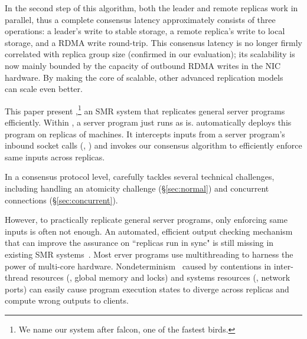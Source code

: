 In the second step of this algorithm, both the leader and remote replicas work 
in parallel, thus a complete consensus latency approximately consists of 
three operations: a leader's write to stable storage, a remote replica's write 
to local storage, and a RDMA write round-trip. This consensus 
latency is no longer firmly correlated with replica group size (confirmed in 
our evaluation); its scalability is now mainly bounded by the capacity of 
outbound RDMA writes in the NIC hardware. By making the core of \paxos 
scalable, other advanced replication 
models~\cite{epaxos:sosp13,mencius:osdi08,scatter:sosp11,manos:hotdep10} can 
scale even better.

This paper present \xxx,\footnote{We name our system after falcon, one of the 
fastest birds.} an SMR system that replicates general server programs 
efficiently. Within \xxx, a server program just runs as is. \xxx 
automatically deploys this program on replicas of machines. It intercepts 
inputs from a server program's inbound socket calls (\eg, \recv) and invokes 
our \paxos consensus algorithm to efficiently enforce same inputs across 
replicas.

In a consensus protocol level, \xxx carefully tackles several technical 
challenges, including handling an atomicity challenge (\S\ref{sec:normal}) and 
concurrent connections (\S\ref{sec:concurrent}).


However, to practically replicate general server programs, only enforcing same 
inputs is often not enough. An automated, efficient output checking mechanism 
that can improve the assurance on ``replicas run in sync" is still missing in 
existing SMR 
systems~\cite{calvin:sigmod12,rex:eurosys14,crane:sosp15,dare:hpdc15}. 
Most erver programs use multithreading to harness the power of multi-core 
hardware. Nondeterminism~\cite{racepro:sosp11,dmp:asplos09,coredet:asplos10,
cui:tern:osdi10, kendo:asplos09,
dthreads:sosp11,peregrine:sosp11,parrot:sosp13,determinator:osdi10} caused by 
contentions in inter-thread resources (\eg, global memory and locks) and systems 
resources (\eg, network ports) can easily cause program execution states to 
diverge across replicas and compute wrong outputs to clients.

